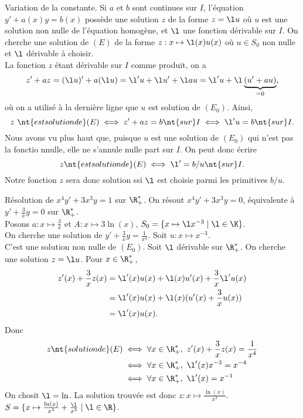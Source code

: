 \documentclass[11pt]{article}
\begin{document}
\begin{prop}{Variation de la constante.}{}
    Si $a$ et $b$ sont continues sur $I$, l'équation $y'+a(x)y=b(x)$ possède une solution $z$ de la forme $z=\l u$ où $u$ est une solution non nulle de l'équation homogène, et $\l$ une fonction dérivable sur $I$.
    \tcblower
    On cherche une solution de $(E)$ de la forme $z:x\mapsto \l(x) u(x)$ où $u\in S_0$ non nulle et $\l$ dérivable à choisir.\\
    La fonction $z$ étant dérivable sur $I$ comme produit, on a
    \begin{equation*}
        z'+az = (\l u)' + a(\l u) = \l' u + \l u' + \l a u = \l' u + \l\underbrace{(u'+au)}_{=0},
    \end{equation*}
    où on a utilisé à la dernière ligne que $u$ est solution de $(E_0)$. Ainsi,
    \begin{equation*}
        z~\nt{est solution de } (E) \iff z' + az = b \nt{ sur } I \iff \l' u = b \nt{ sur } I.
    \end{equation*}
    Nous avons vu plus haut que, puisque $u$ est une solution de $(E_0)$ qui n'est pas la fonctio nnulle, elle ne s'annule nulle part sur $I$. On peut donc écrire
    \begin{equation*}
        z \nt{ est solution de } (E) \iff \l' = b/u \nt{ sur } I.
    \end{equation*}
    Notre fonction $z$ sera donc solution ssi $\l$ est choisie parmi les primitives $b/u$.
\end{prop}

\begin{ex}{}{}
    Résolution de $x^4y'+3x^3y=1$ sur $\R_+^*$.
    \tcblower
     On résout $x^4y'+3x^3y=0$, équivalente à $y'+\frac{3}{x}y=0$ sur $\R_+^*$.\\
    Posons $a:x\mapsto \frac{3}{x}$ et $A:x\mapsto3\ln(x)$, $S_0=\{x\mapsto \l x^{-3} \mid \l \in \K\}$.\\
     On cherche une solution de $y'+\frac{3}{x}y=\frac{1}{x^4}$. Soit $u:x\mapsto x^{-3}$.\\
    C'est une solution non nulle de $(E_0)$. Soit $\l$ dérivable sur $\R_+^*$. On cherche une solution $z=\l u$. Pour $x\in\R_+^*$,
    \begin{align*}
        z'(x)+\frac{3}{x}z(x) &= \l'(x)u(x)+\l(x)u'(x)+\frac{3}{x}\l'u(x)\\
        &=\l'(x)u(x)+\l(x)(u'(x)+\frac{3}{x}u(x))\\
        &=\l'(x)u(x).
    \end{align*}
    Donc
    \begin{align*}
        z \nt{ solution de } (E) &\iff \forall x \in \R_+^*, ~ z'(x)+\frac{3}{x}z(x)=\frac{1}{x^4}\\
        &\iff \forall x \in \R_+^*, ~ \l'(x)x^{-3} = x^{-4}\\
        &\iff \forall x \in \R^*_+, ~ \l'(x) = x^{-1}
    \end{align*}
    On chosit $\l=\ln$. La solution trouvée est donc $z:x\mapsto\frac{\ln(x)}{x^3}$.\\
     $S=\{x \mapsto \frac{\ln(x)}{x^3} + \frac{\l}{x^3} \mid \l \in \R\}$.
\end{ex}
\end{document}
